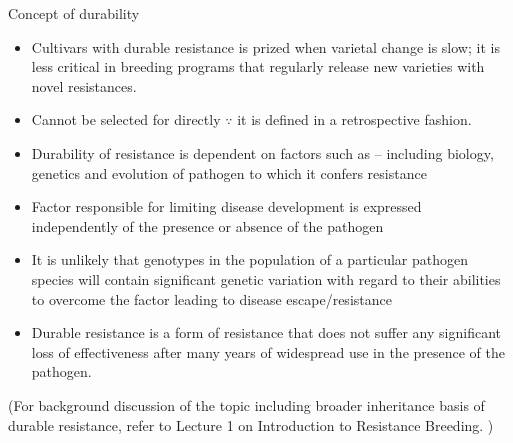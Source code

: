 \documentclass[11pt,dvipsnames,ignorenonframetext,aspectratio=169]{beamer}
\providecommand{\tightlist}{%
  \setlength{\itemsep}{0pt}\setlength{\parskip}{0pt}}
\begin{document}
\begin{frame}{Concept of durability}
\protect\hypertarget{concept-of-durability}{}
\footnotesize

\begin{itemize}
\tightlist
\item
  Cultivars with durable resistance is prized when varietal change is
  slow; it is less critical in breeding programs that regularly release
  new varieties with novel resistances.
\item
  Cannot be selected for directly \(\because\) it is defined in a
  retrospective fashion.
\item
  Durability of resistance is dependent on factors such as -- including
  biology, genetics and evolution of pathogen to which it confers
  resistance
\item
  Factor responsible for limiting disease development is expressed
  independently of the presence or absence of the pathogen
\item
  It is unlikely that genotypes in the population of a particular
  pathogen species will contain significant genetic variation with
  regard to their abilities to overcome the factor leading to disease
  escape/resistance
\item
  Durable resistance is a form of resistance that does not suffer any
  significant loss of \alert{effectiveness} after many years of
  widespread use in the presence of the pathogen.
\end{itemize}

(\scriptsize For background discussion of the topic including broader
inheritance basis of durable resistance, refer to Lecture 1 on
Introduction to Resistance Breeding. )
\end{frame}
\end{document}
